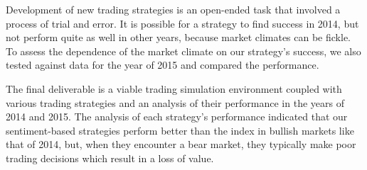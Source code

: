 Development of new trading strategies is an open-ended task that involved a process of trial and error.
It is possible for a strategy to find success in 2014, but not perform quite as well in other years, because market climates can be fickle.
To assess the dependence of the market climate on our strategy's success, we also tested against data for the year of 2015 and compared the performance.

The final deliverable is a viable trading simulation environment coupled with various trading strategies and an analysis of their performance in the years of 2014 and 2015.
The analysis of each strategy's performance indicated that our sentiment-based strategies perform better than the index in bullish markets like that of 2014, but, when they encounter a bear market, they typically make poor trading decisions which result in a loss of value.


